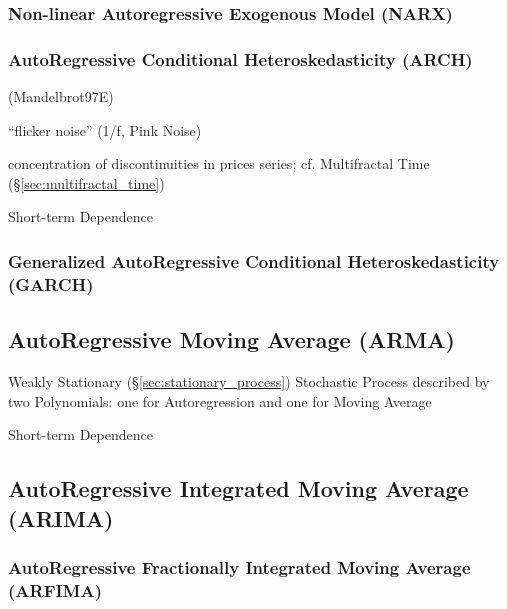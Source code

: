 \subsubsection{Non-linear Autoregressive Exogenous Model (NARX)}\label{sec:narx}

\subsubsection{AutoRegressive Conditional Heteroskedasticity (ARCH)}
\label{sec:arch}

(Mandelbrot97E)

``flicker noise'' (1/f, Pink Noise)

concentration of discontinuities in prices series; cf. Multifractal Time
(\S\ref{sec:multifractal_time})

Short-term Dependence



\subsubsection{Generalized AutoRegressive Conditional Heteroskedasticity (GARCH)}
\label{sec:garch}



\subsection{AutoRegressive Moving Average (ARMA)}\label{sec:arma}

Weakly Stationary (\S\ref{sec:stationary_process}) Stochastic Process described
by two Polynomials: one for Autoregression and one for Moving Average

Short-term Dependence



\subsection{AutoRegressive Integrated Moving Average (ARIMA)}\label{sec:arima}

\subsubsection{AutoRegressive Fractionally Integrated Moving Average (ARFIMA)}
\label{sec:arfima}

